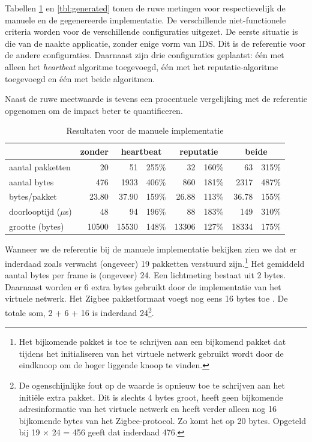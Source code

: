 Tabellen \ref{tbl:manual} en \ref{tbl:generated} tonen de ruwe metingen voor
respectievelijk de manuele en de gegenereerde implementatie. De verschillende
niet-functionele criteria worden voor de verschillende configuraties uitgezet.
De eerste situatie is die van de naakte applicatie, zonder enige vorm van IDS.
Dit is de referentie voor de andere configuraties. Daarnaast zijn drie
configuraties geplaatst: \'e\'en met alleen het \emph{heartbeat} algoritme
toegevoegd, \'e\'en met het reputatie-algoritme toegevoegd en \'e\'en met beide
algoritmen.

Naast de ruwe meetwaarde is tevens een procentuele vergelijking met de
referentie opgenomen om de impact beter te quantificeren.

\begin{table}[H]
  \centering
  \begin{tabular}{l|r|rr|rr|rr}
  \hline
      & zonder & \multicolumn{2}{c|}{heartbeat} & \multicolumn{2}{c|}{reputatie} & \multicolumn{2}{c}{beide} \\
  \hline
  \hline

aantal pakketten      &    20    &    51    & 255\% &    32    & 160\% &    63    & 315\% \\
aantal bytes          &   476    &  1933    & 406\% &   860    & 181\% &  2317    & 487\% \\
bytes/pakket          &    23.80 &    37.90 & 159\% &    26.88 & 113\% &    36.78 & 155\% \\
doorlooptijd ($\mu$s) &    48    &    94    & 196\% &    88    & 183\% &   149    & 310\% \\
grootte (bytes)       & 10500    & 15530    & 148\% & 13306    & 127\% & 18334    & 175\% \\

  \hline
  \end{tabular}
  \caption{Resultaten voor de manuele implementatie}
  \label{tbl:manual}
\end{table}

Wanneer we de referentie bij de manuele implementatie bekijken zien we dat er
inderdaad zoals verwacht (ongeveer) 19 pakketten verstuurd zijn.\footnote{Het
bijkomende pakket is toe te schrijven aan een bijkomend pakket dat tijdens het
initialiseren van het virtuele netwerk gebruikt wordt door de eindknoop om de
hoger liggende knoop te vinden.} Het gemiddeld aantal bytes per frame is
(ongeveer) 24. Een lichtmeting bestaat uit 2 bytes. Daarnaast worden er 6 extra
bytes gebruikt door de implementatie van het virtuele netwerk. Het Zigbee
pakketformaat voegt nog eens 16 bytes toe \citep{alliance2012zigbee}. De totale
som, 2 + 6 + 16 is inderdaad 24\footnote{De ogenschijnlijke fout op de waarde
is opnieuw toe te schrijven aan het initi\"ele extra pakket. Dit is slechts 4
bytes groot, heeft geen bijkomende adresinformatie van het virtuele netwerk en
heeft verder alleen nog 16 bijkomende bytes van het Zigbee-protocol. Zo komt
het op 20 bytes. Opgeteld bij 19 $\times$ 24 = 456 geeft dat inderdaad 476.}.

